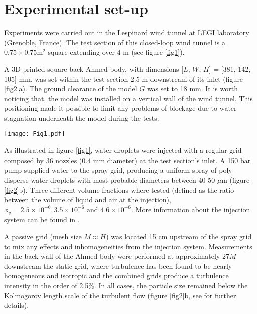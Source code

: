 \documentclass[doublecol]{epl2}
\begin{document}
\section{Experimental set-up}

Experiments were carried out in the Lespinard wind tunnel at LEGI laboratory (Grenoble, France). The test section of this closed-loop wind tunnel is a $0.75\times0.75 \mbox{m}^2$ square extending over 4 m (see figure \ref{fig1}).

A 3D-printed square-back Ahmed body, with dimensions [$L$, $W$, $H$] = [381, 142, 105] mm, was set within the test section 2.5 m downstream of its inlet (figure \ref{fig2}a). The ground clearance of the model $G$ was set to 18 mm. It is worth noticing that, the model was installed on a vertical wall of the wind tunnel. This positioning made it possible to limit any problems of blockage due to water stagnation underneath the model during the tests.

\begin{figure*}
\centering
\texttt{[image: Fig1.pdf]}
\caption{Sketch of the experimental setup, showing the passive grid and the injection system (left picture). The distribution of the pressure taps is displayed in the right insert together with the coordinate system. The pressure taps indicated by the blue and red circles are those used in figure \ref{fig4} to illustrate the switching of the wake from left to right and vice versa.}
\label{fig1}
\end{figure*}

As illustrated in figure \ref{fig1}, water droplets were injected with a regular grid composed by 36 nozzles (0.4 mm diameter) at the test section's inlet. A 150 bar pump supplied water to the spray grid, producing a uniform spray of poly-disperse water droplets with most probable diameters between 40-50 $\mu$m (figure \ref{fig2}b). Three different volume fractions where tested (defined as the ratio between the volume of liquid and air at the injection), $\phi_v = 2.5\times10^{-6}, 3.5\times10^{-6} \mbox{ and } 4.6\times10^{-6}$. More information about the injection system can be found in \cite{sumbekova2017preferential,ferran2022experimental}.

A passive grid (mesh size $M \approx H$) was located 15 cm upstream of the spray grid to mix any effects and inhomogeneities from the injection system. Measurements in the back wall of the Ahmed body were performed at approximately $27 M$ downstream the static grid, where turbulence has been found to be nearly homogeneous and isotropic and the combined grids produce a turbulence intensity in the order of 2.5\%. In all cases, the particle size remained below the Kolmogorov length scale of the turbulent flow (figure \ref{fig2}b, see \cite{ferran2022experimental} for further details).
\end{document}
